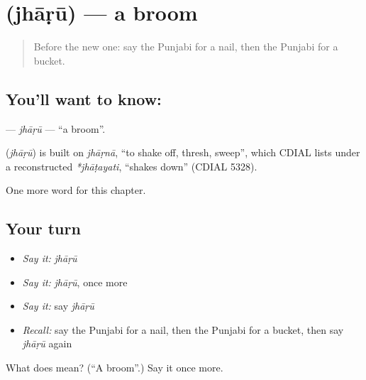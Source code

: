 \section[\texorpdfstring{\pa{ਝਾੜੂ} (jhāṛū)}{ਝਾੜੂ (jhāṛū)}]{ (jhāṛū) — a broom}

\label{lesson:PA-C116-jharu}



\begin{quote}
Before the new one: say the Punjabi for a nail, then the Punjabi for a bucket.
\end{quote}

\subsection*{You'll want to know: }
\textbf{} — \emph{jhāṛū} — \textquotedblleft{}a broom\textquotedblright{}.

\begin{cousinweb}
\textbf{} (\emph{jhāṛū}) is built on \emph{jhāṛnā}, \textquotedblleft{}to shake off, thresh, sweep\textquotedblright{}, which CDIAL lists under a reconstructed \emph{*jhāṭayati}, \textquotedblleft{}shakes down\textquotedblright{} (CDIAL 5328).
\end{cousinweb}

\begin{grammarlens}[title={What you've built}]
One more word for this chapter.
\end{grammarlens}

\subsection*{Your turn}
\begin{itemize}
\raggedright
  \item \emph{Say it:} \emph{jhāṛū}
  \item \emph{Say it:} \emph{jhāṛū}, once more
  \item \emph{Say it:} say \emph{jhāṛū}
  \item \emph{Recall:} say the Punjabi for a nail, then the Punjabi for a bucket, then say \emph{jhāṛū} again
\end{itemize}

\begin{tcolorbox}[breakable,colback=teal!4,colframe=teal!35!black,title={Before you move on}]
What does  mean? (\textquotedblleft{}A broom\textquotedblright{}.) Say it once more.
\end{tcolorbox}
